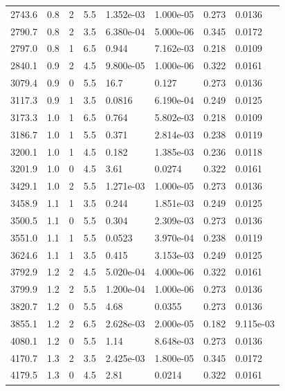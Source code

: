 \documentclass[preview]{standalone}
\begin{document}
{{{\begin{tabular}{L{1.2cm}C{1.2cm} C{0.3cm}C{0.5cm} C{1.4cm}C{1.4cm} C{1.4cm}C{1.4cm}}
  2743.6  &   0.8  & 2     & 5.5 &  1.352e-03  & 1.000e-05  & 0.273 &  0.0136   \\ 
  2790.7  &   0.8  & 2     & 3.5 &  6.380e-04  & 5.000e-06  & 0.345 &  0.0172   \\ 
  2797.0  &   0.8  & 1     & 6.5 &  0.944  & 7.162e-03  & 0.218 &  0.0109   \\ 
  2840.1  &   0.9  & 2     & 4.5 &  9.800e-05  & 1.000e-06  & 0.322 &  0.0161   \\ 
  3079.4  &   0.9  & 0     & 5.5 &  16.7  & 0.127  & 0.273 &  0.0136   \\ 
  3117.3  &   0.9  & 1     & 3.5 &  0.0816  & 6.190e-04  & 0.249 &  0.0125   \\ 
  3173.3  &   1.0  & 1     & 6.5 &  0.764  & 5.802e-03  & 0.218 &  0.0109   \\ 
  3186.7  &   1.0  & 1     & 5.5 &  0.371  & 2.814e-03  & 0.238 &  0.0119   \\ 
  3200.1  &   1.0  & 1     & 4.5 &  0.182  & 1.385e-03  & 0.236 &  0.0118   \\ 
  3201.9  &   1.0  & 0     & 4.5 &  3.61  & 0.0274  & 0.322 &  0.0161   \\ 
  3429.1  &   1.0  & 2     & 5.5 &  1.271e-03  & 1.000e-05  & 0.273 &  0.0136   \\ 
  3458.9  &   1.1  & 1     & 3.5 &  0.244  & 1.851e-03  & 0.249 &  0.0125   \\ 
  3500.5  &   1.1  & 0     & 5.5 &  0.304  & 2.309e-03  & 0.273 &  0.0136   \\ 
  3551.0  &   1.1  & 1     & 5.5 &  0.0523  & 3.970e-04  & 0.238 &  0.0119   \\ 
  3624.6  &   1.1  & 1     & 3.5 &  0.415  & 3.153e-03  & 0.249 &  0.0125   \\ 
  3792.9  &   1.2  & 2     & 4.5 &  5.020e-04  & 4.000e-06  & 0.322 &  0.0161   \\ 
  3799.9  &   1.2  & 2     & 5.5 &  1.200e-04  & 1.000e-06  & 0.273 &  0.0136   \\ 
  3820.7  &   1.2  & 0     & 5.5 &  4.68  & 0.0355  & 0.273 &  0.0136   \\ 
  3855.1  &   1.2  & 2     & 6.5 &  2.628e-03  & 2.000e-05  & 0.182 &  9.115e-03   \\ 
  4080.1  &   1.2  & 0     & 5.5 &  1.14  & 8.648e-03  & 0.273 &  0.0136   \\ 
  4170.7  &   1.3  & 2     & 3.5 &  2.425e-03  & 1.800e-05  & 0.345 &  0.0172   \\ 
  4179.5  &   1.3  & 0     & 4.5 &  2.81  & 0.0214  & 0.322 &  0.0161   \\ 

\end{tabular}}}}
\end{document}
